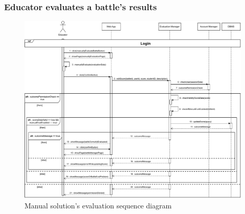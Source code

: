\documentclass{article}
\begin{document}
{    \subsubsection{Educator evaluates a battle's results}
        \begin{figure}[H]
            \centering
            \hspace*{-3.5cm}\includegraphics[scale=0.65]{Sequence/Sequence8DD.pdf}
            \caption{Manual solution's evaluation sequence diagram}
            \label{fig:Sequence8DD}
        \end{figure}
        
}
\end{document}

